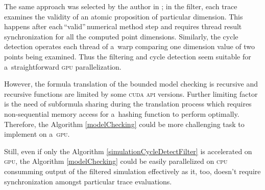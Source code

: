 \documentclass[12pt,twoside,draft]{fithesis}
\begin{document}
The same approach was selected by the author in \cite{me:cuda}; in the
filter, each trace examines the validity of an atomic proposition of
particular dimension. This happens after each\,``valid''\,numerical
method step and requires thread result synchronization for all the
computed point dimensions. Similarly, the cycle detection operates each
thread of a~warp comparing one dimension value of two points being
examined. Thus the filtering and cycle detection seem suitable for
a~straightforward \textsc{gpu} parallelization.

However, the formula translation of the bounded model checking is
recursive and recursive functions are limited by some \textsc{cuda}
\textsc{api} versions\cite{cuda:relnotes}. Further limiting factor is
the need of subformula sharing during the translation process which
requires non-sequential memory access for a~hashing function to perform
optimally. Therefore, the Algorithm \ref{modelChecking} could be more
challenging task to implement on a~\textsc{gpu}.

Still, even if only the Algorithm \ref{simulationCycleDetectFilter}
is accelerated on \textsc{gpu}, the Algorithm \ref{modelChecking}
could be easily parallelized on \textsc{cpu} consumming output of the
filtered simulation effectively as it, too, doesn't require
synchronization amongst particular trace evaluations.



\end{document}

